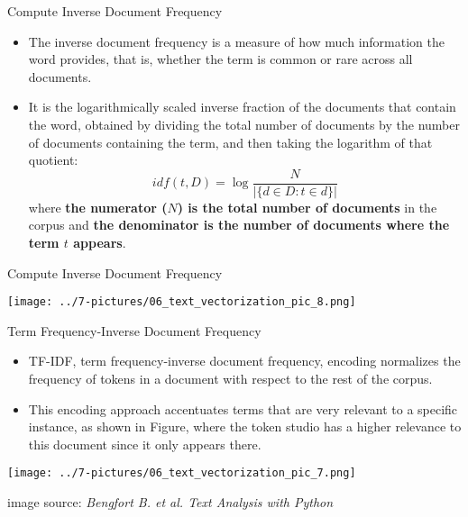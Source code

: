 \documentclass[11pt]{beamer}
\begin{document}
\begin{frame}{Compute Inverse Document Frequency}
	\begin{itemize}
		\item The inverse document frequency is a measure of how much information the word provides, that is, whether the term is common or rare across all documents. 
		\item It is the logarithmically scaled inverse fraction of the documents that contain the word, obtained by dividing the total number of documents by the number of documents containing the term, and then taking the logarithm of that quotient: 
		\begin{equation}idf(t,D) = \log \frac{N}{\vert \{  d \in D: t \in d\}\vert} 
		\end{equation}  
		where \textbf{the numerator ($N$) is the total number of documents} in the corpus and \textbf{the denominator is the number of documents where the term $t$ appears}.
	\end{itemize}
\end{frame}
\begin{frame}{Compute Inverse Document Frequency}
	\begin{center}
	\texttt{[image: ../7-pictures/06\_text\_vectorization\_pic\_8.png]}
	\end{center}
\end{frame}
\begin{frame}{Term Frequency-Inverse Document Frequency }
	\begin{itemize}
		\item TF-IDF, term frequency-inverse document frequency, encoding normalizes the frequency of tokens in a document with respect to the rest of the corpus. 
		\item This encoding approach accentuates terms that are very relevant to a specific instance, as shown in Figure, where the token studio has a higher relevance to this document since it only appears there.
	\end{itemize}
	\begin{center}
	\texttt{[image: ../7-pictures/06\_text\_vectorization\_pic\_7.png]}
	\end{center}
	\footnotesize{image source: \textit{Bengfort B. et al. Text Analysis with Python}}
\end{frame}
\end{document}
